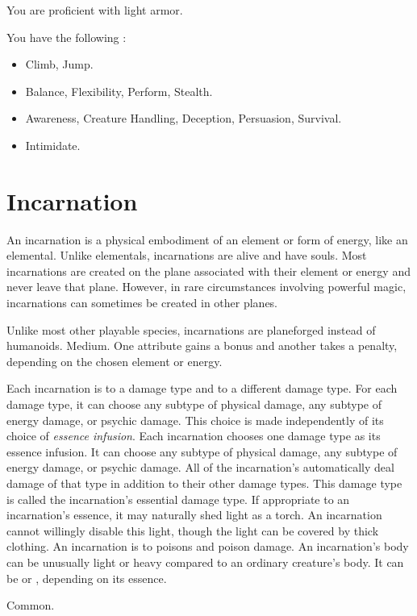 You are proficient with light armor.

You have the following :
\begin{itemize}
	\item {} Climb, Jump.
	\item {} Balance, Flexibility, Perform, Stealth.
	\item {} Awareness, Creature Handling, Deception, Persuasion, Survival.
	\item {} Intimidate.
\end{itemize}

\section{Incarnation}

An incarnation is a physical embodiment of an element or form of energy, like an elemental.
Unlike elementals, incarnations are alive and have souls.
Most incarnations are created on the plane associated with their element or energy and never leave that plane.
However, in rare circumstances involving powerful magic, incarnations can sometimes be created in other planes.

 Unlike most other playable species, incarnations are planeforged instead of humanoids.
 Medium.
 One attribute gains a  bonus and another takes a  penalty, depending on the chosen element or energy.
\begin{itemize}
	 Each incarnation is \impervious to a damage type and \vulnerable to a different damage type.
	      For each damage type, it can choose any subtype of physical damage, any subtype of energy damage, or psychic damage.
	      This choice is made independently of its choice of \textit{essence infusion}.
	       Each incarnation chooses one damage type as its essence infusion.
	      It can choose any subtype of physical damage, any subtype of energy damage, or psychic damage.
	      All of the incarnation's  automatically deal damage of that type in addition to their other damage types.
	      This damage type is called the incarnation's essential damage type.
	 If appropriate to an incarnation's essence, it may naturally shed light as a torch.
	      An incarnation cannot willingly disable this light, though the light can be covered by thick clothing.
	 An incarnation is \impervious to poisons and poison damage.
	 An incarnation's body can be unusually light or heavy compared to an ordinary creature's body.
	      It can be  or , depending on its essence.
\end{itemize}
 Common.

